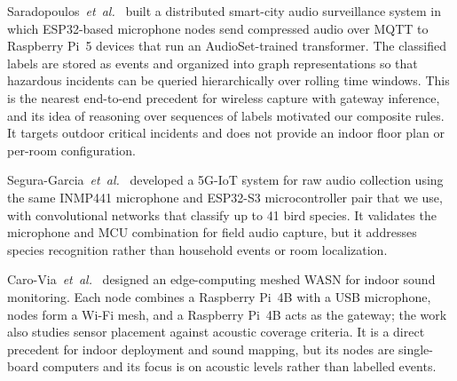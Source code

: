 \documentclass[conference]{IEEEtran}
\begin{document}
Saradopoulos~\textit{et~al.}~\cite{saradopoulos2025} built a distributed smart-city audio surveillance system in which ESP32-based microphone nodes send compressed audio over MQTT to Raspberry Pi~5 devices that run an AudioSet-trained transformer. The classified labels are stored as events and organized into graph representations so that hazardous incidents can be queried hierarchically over rolling time windows. This is the nearest end-to-end precedent for wireless capture with gateway inference, and its idea of reasoning over sequences of labels motivated our composite rules. It targets outdoor critical incidents and does not provide an indoor floor plan or per-room configuration.

Segura-Garcia~\textit{et~al.}~\cite{seguragarcia2024} developed a 5G-IoT system for raw audio collection using the same INMP441 microphone and ESP32-S3 microcontroller pair that we use, with convolutional networks that classify up to 41 bird species. It validates the microphone and MCU combination for field audio capture, but it addresses species recognition rather than household events or room localization.

Caro-Via~\textit{et~al.}~\cite{carovia2022} designed an edge-computing meshed WASN for indoor sound monitoring. Each node combines a Raspberry Pi~4B with a USB microphone, nodes form a Wi-Fi mesh, and a Raspberry Pi~4B acts as the gateway; the work also studies sensor placement against acoustic coverage criteria. It is a direct precedent for indoor deployment and sound mapping, but its nodes are single-board computers and its focus is on acoustic levels rather than labelled events.
\end{document}
